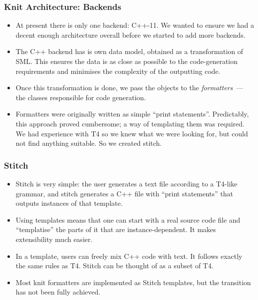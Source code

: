 \documentclass{beamer}
\begin{document}
\begin{frame}
\frametitle{Knit Architecture: Backends}

\begin{itemize}

\item At present there is only one backend: C++-11. We wanted to
  ensure we had a decent enough architecture overall before we started
  to add more backends.

\pause

\item The C++ backend has is own data model, obtained as a
  transformation of SML. This ensures the data is as close as possible
  to the code-generation requirements and minimises the complexity of
  the outputting code.

\pause

\item Once this transformation is done, we pass the objects to the
  \emph{formatters}~--- the classes responsible for code generation.

\pause

\item Formatters were originally written as simple ``print
  statements''. Predictably, this approach proved cumbersome; a way of
  templating them was required. We had experience with T4 so we knew
  what we were looking for, but could not find anything suitable. So
  we created stitch.

\end{itemize}

\end{frame}

\begin{frame}
\frametitle{Stitch}

\begin{itemize}

\item Stitch is very simple: the user generates a text file according
  to a T4-like grammar, and stitch generates a C++ file with ``print
  statements'' that outputs instances of that template.

\pause

\item Using templates means that one can start with a real source code
  file and ``templatise'' the parts of it that are
  instance-dependent. It makes extensibility much easier.

\pause

\item In a template, users can freely mix C++ code with text. It
  follows exactly the same rules as T4. Stitch can be thought of as a
  subset of T4.

\pause

\item Most knit formatters are implemented as Stitch templates, but
  the transition has not been fully achieved.

\end{itemize}

\end{frame}
\end{document}

